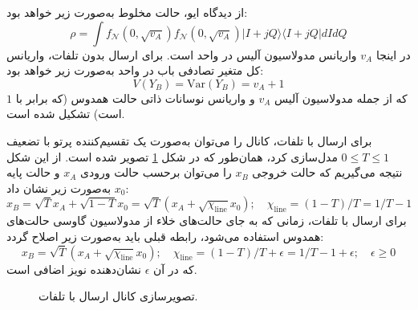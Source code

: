 از دیدگاه ایو، حالت مخلوط به‌صورت زیر خواهد بود:
\begin{equation}
	\rho = \int f_{\mathcal{N}}(0, \sqrt{v_A}) f_{\mathcal{N}}(0, \sqrt{v_A}) |I + jQ\rangle \langle I + jQ| dI dQ
	\label{eq:6-82}
\end{equation}
در اینجا $v_A$ واریانس مدولاسیون آلیس در واحد  است. برای ارسال بدون تلفات، واریانس کل متغیر تصادفی باب در واحد  به‌صورت زیر خواهد بود:
\begin{equation}
	V(Y_B) = \text{Var}(Y_B) = v_A + 1
	\label{eq:6-83}
\end{equation}
که از جمله مدولاسیون آلیس $v_A$ و واریانس نوسانات ذاتی حالت همدوس (که برابر با $1$ است) تشکیل شده است.

برای ارسال با تلفات، کانال را می‌توان به‌صورت یک تقسیم‌کننده پرتو با تضعیف $0 \leq T \leq 1$ مدل‌سازی کرد، همان‌طور که در شکل \ref{fig:6-27} تصویر شده است. از این شکل نتیجه می‌گیریم که حالت خروجی $x_B$ را می‌توان برحسب حالت ورودی $x_A$ و حالت پایه $x_0$ به‌صورت زیر نشان داد:
\begin{equation}
	x_B = \sqrt{T} x_A + \sqrt{1-T} x_0 = \sqrt{T} (x_A + \sqrt{\chi_{\text{line}}} x_0); \quad \chi_{\text{line}} = (1-T)/T = 1/T - 1
	\label{eq:6-84}
\end{equation}
برای ارسال با تلفات، زمانی که به جای حالت‌های خلاء از مدولاسیون گاوسی حالت‌های همدوس استفاده می‌شود، رابطه قبلی باید به‌صورت زیر اصلاح گردد:
\begin{equation}
	x_B = \sqrt{T} (x_A + \sqrt{\chi_{\text{line}}} x_0); \quad \chi_{\text{line}} = (1-T)/T + \epsilon = 1/T - 1 + \epsilon; \quad \epsilon \geq 0
	\label{eq:6-85}
\end{equation}
که در آن $\epsilon$ نشان‌دهنده نویز اضافی است.


\begin{figure}[ht]
	\centering
	\caption{تصویرسازی کانال ارسال با تلفات.}
	\label{fig:6-27}
\end{figure}

